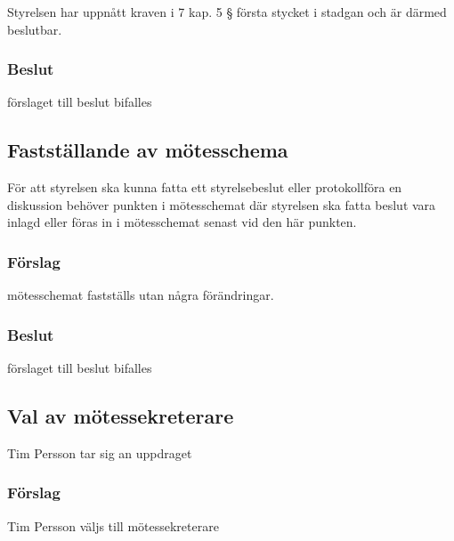 \documentclass[protokoll]{dvd}
\begin{document}
\begin{attsatser}
    \item Styrelsen har uppnått kraven i 7 kap. 5 § första stycket i stadgan och är därmed beslutbar.
\end{attsatser}
\subsubsection*{Beslut}
\begin{attsatser}
    \item förslaget till beslut bifalles
\end{attsatser}


\subsection{Fastställande av mötesschema}

För att styrelsen ska kunna fatta ett styrelsebeslut eller protokollföra en diskussion behöver punkten i mötesschemat där styrelsen ska fatta beslut vara inlagd eller föras in i mötesschemat senast vid den här punkten.

\subsubsection*{Förslag}

\begin{attsatser}
    \item mötesschemat fastställs utan några förändringar.
\end{attsatser}
\subsubsection*{Beslut}
\begin{attsatser}
    \item förslaget till beslut bifalles
\end{attsatser}

\subsection{Val av mötessekreterare}
Tim Persson tar sig an uppdraget
\subsubsection*{Förslag}
\begin{attsatser}
    \item Tim Persson väljs till mötessekreterare
\end{attsatser}
\end{document}
